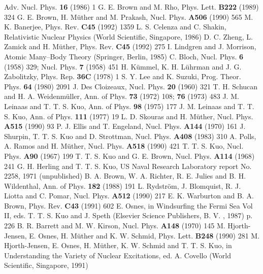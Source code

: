 {\begin{thebibliography}{99}
Adv. Nucl. Phys. {\bf 16} (1986) 1
 G. E. Brown and M. Rho, Phys. Lett. {\bf B222} (1989) 324
G. E. Brown, H. M\"{u}ther and M. Prakash, Nucl.
Phys. {\bf A506} (1990) 565
 M. K. Banerjee, Phys. Rev. {\bf C45} (1992) 1359
 L. S. Celenza and C. Shakin, Relativistic Nuclear Physics
(World Scientific, Singapore, 1986) 
 D. C. Zheng, L. Zamick and H. M\"{u}ther,
Phys. Rev. {\bf C45} (1992) 275
 I. Lindgren and J. Morrison, Atomic Many--Body Theory
(Springer, Berlin, 1985)
 C. Bloch, Nucl. Phys. {\bf 6} (1958) 329;
Nucl. Phys. {\bf 7} (1958) 451
 H. K\"{u}mmel, K. H. L\"{u}hrman and J. G.
Zabolitzky, Phys. Rep. {\bf 36C} (1978) 1
 S. Y. Lee and K. Suzuki, Prog. Theor. Phys.
{\bf 64} (1980) 2091
 J. Des Cloizeaux, Nucl. Phys. {\bf 20} (1960) 321
 T. H. Schucan and H. A. Weidenm\"{u}ller, Ann. of Phys. 
{\bf 73} (1972) 108; {\bf 76} (1973) 483
 J. M. Leinaas and T. T. S. Kuo, Ann. of Phys.
{\bf 98} (1975) 177
 J. M. Leinaas and T. T. S. Kuo, Ann. of Phys.
{\bf 111} (1977) 19
 L. D. Skouras and H. M\"{u}ther, Nucl. Phys. {\bf A515}
(1990) 93
 P. J. Ellis and T. Engeland, Nucl. Phys. {\bf A144} (1970) 161
 J. Shurpin, T. T. S. Kuo and D. Strottman,
Nucl. Phys. {\bf A408} (1983) 310
 A. Polls, A. Ramos and H. M\"{u}ther, Nucl. Phys. {\bf
A518} (1990) 421
 T. T. S. Kuo, Nucl. Phys. {\bf A90} (1967) 199
 T. T. S. Kuo and G. E. Brown, Nucl. Phys. {\bf A114} (1968)
241
 G. H. Herling and T. T. S. Kuo, US Naval Research Laboratory
report No. 2258, 1971 (unpublished)
B. A. Brown, W. A. Richter, R. E. Julies
and B. H. Wildenthal, Ann. of Phys. {\bf 182} (1988) 191
 L. Rydstr\"{o}m, J. Blomquist, R. J. Liotta and C. Pomar,
Nucl. Phys. {\bf A512} (1990) 217
 E. K. Warburton and B. A. Brown,
Phys. Rev. {\bf C43} (1991) 602
  E. Osnes, in Windsurfing the Fermi Sea Vol II, eds. T. T. S. Kuo
and J. Speth  (Elsevier Science Publishers, B. V. , 1987) p. 226
 B. R. Barrett and M. W. Kirson, Nucl. Phys.
{\bf A148} (1970) 145
 M. Hjorth-Jensen, E. Osnes, H. M\"{u}ther
and K. W. Schmid, Phys. Lett. {\bf B248} (1990) 281
M. Hjorth-Jensen, E. Osnes, H. M\"{u}ther,
K. W. Schmid and T. T. S. Kuo, in  Understanding the Variety
of Nuclear Excitations, ed. A. Covello  (World Scientific, Singapore, 1991)

\end{thebibliography}}
